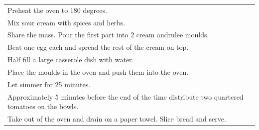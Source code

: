 \begin{tabular}{p{15cm}}
	\\
  Preheat the oven to 180 degrees.\\
  Mix sour cream with spices and herbs.\\
  Share the mass. Pour the first part into 2 cream andrulee moulds.\\
  Beat one egg each and spread the rest of the cream on top.\\
  Half fill a large casserole dish with water.\\
  Place the moulds in the oven and push them into the oven.\\
  Let simmer for 25 minutes.\\
  Approximately 5 minutes before the end of the time distribute two quartered tomatoes on the bowls.\\
  Take out of the oven and drain on a paper towel. Slice bread and serve.
\end{tabular}
